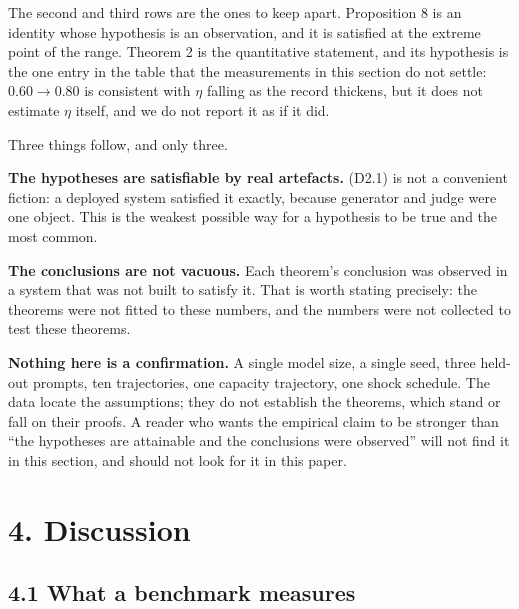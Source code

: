 \documentclass[11pt,a4paper]{article}
\begin{document}
The second and third rows are the ones to keep apart. Proposition 8 is an identity
whose hypothesis is an observation, and it is satisfied at the extreme point of the
range. Theorem 2 is the quantitative statement, and its hypothesis is the one entry
in the table that the measurements in this section do not settle: \(0.60\to0.80\) is
consistent with \(\eta\) falling as the record thickens, but it does not estimate
\(\eta\) itself, and we do not report it as if it did.

Three things follow, and only three.

\textbf{The hypotheses are satisfiable by real artefacts.} (D2.1) is not a convenient
fiction: a deployed system satisfied it exactly, because generator and judge were
one object. This is the weakest possible way for a hypothesis to be true and the
most common.

\textbf{The conclusions are not vacuous.} Each theorem's conclusion was observed in a
system that was not built to satisfy it. That is worth stating precisely: the
theorems were not fitted to these numbers, and the numbers were not collected to
test these theorems.

\textbf{Nothing here is a confirmation.} A single model size, a single seed, three
held-out prompts, ten trajectories, one capacity trajectory, one shock schedule.
The data locate the assumptions; they do not establish the theorems, which stand
or fall on their proofs. A reader who wants the empirical claim to be stronger than
``the hypotheses are attainable and the conclusions were observed'' will not find it
in this section, and should not look for it in this paper.

\section{4. Discussion}\label{discussion}

\subsection{4.1 What a benchmark measures}\label{what-a-benchmark-measures}
\end{document}
